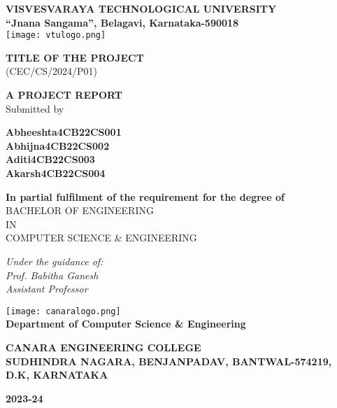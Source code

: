 \documentclass[a4paper,12pt]{article}
\begin{document}
\begin{center}

\Large{\textbf{VISVESVARAYA TECHNOLOGICAL UNIVERSITY}}\\
\textbf{“Jnana Sangama”, Belagavi, Karnataka-590018}\\
\texttt{[image: vtulogo.png]} \\
\vspace{0.5cm}

\textbf{TITLE OF THE PROJECT}\\
\small{(CEC/CS/2024/P01)}\\
\vspace{0.5cm}

\textbf{\large{A PROJECT REPORT}}\\
\small{Submitted by}\\
\vspace{0.5cm}

\textbf{Abheeshta\hspace{0.8cm}4CB22CS001}\\
\textbf{Abhijna\hspace{1.2cm}4CB22CS002}\\
\textbf{Aditi\hspace{1.8cm}4CB22CS003}\\
\textbf{Akarsh\hspace{1.5cm}4CB22CS004}\\
\vspace{0.5cm}

\textbf{In partial fulfilment of the requirement for the degree of}\\
\large{BACHELOR OF ENGINEERING}\\
\large{IN}\\
\large{COMPUTER SCIENCE \& ENGINEERING}\\
\vspace{0.5cm}

\textit{Under the guidance of:}\\
\textit{Prof. Babitha Ganesh}\\
\textit{Assistant Professor}\\
\vspace{0.5cm}

\texttt{[image: canaralogo.png]} \\
\Large{\textbf{Department of Computer Science \& Engineering}}\\
\vspace{0.5cm}

\Large{\textbf{CANARA ENGINEERING COLLEGE}}\\
\small{\textbf{SUDHINDRA NAGARA, BENJANPADAV, BANTWAL-574219, D.K, KARNATAKA}}\\
\vspace{1cm}

\small{\textbf{2023-24}}
\end{center}
\end{document}
